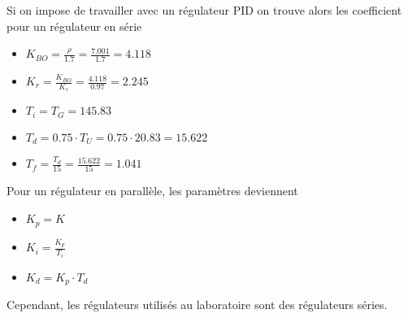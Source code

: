 Si on impose de travailler avec un régulateur PID on trouve alors les coefficient pour un régulateur en série

\begin{itemize}
\item $K_{BO} = \frac{\rho}{1.7} = \frac{7.001}{1.7} = 4.118$
\item $K_{r} = \frac{K_{BO}}{K_{s}} = \frac{4.118}{0.97} = 2.245$
\item $T_{i} = T_{G} = 145.83$

\item $T_{d} = 0.75 \cdot T_{U} = 0.75 \cdot 20.83 = 15.622$
\item $T_{f} = \frac{T_{d}}{15} =  \frac{15.622}{15} = 1.041 $
\end{itemize}

Pour un régulateur en parallèle, les paramètres deviennent 
\begin{itemize}
\item $K_{p} = K$
\item $K_{i} = \frac{K_{p}}{T_{i}}$
\item $K_{d} = K_{p} \cdot T_{d}$
\end{itemize}

Cependant, les régulateurs utilisés au laboratoire sont des régulateurs séries.